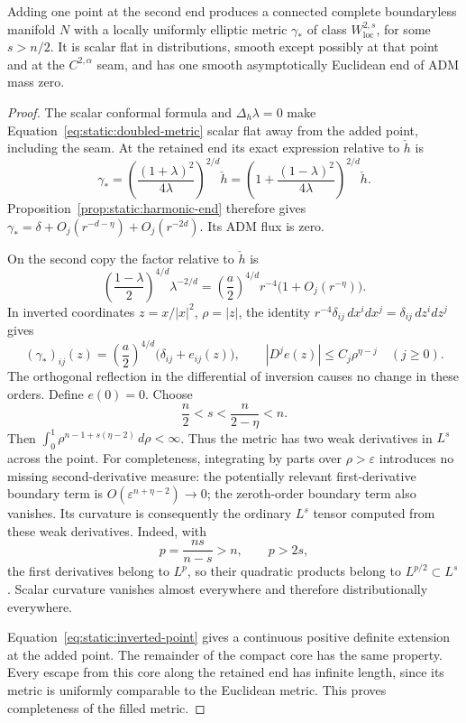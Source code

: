 \begin{lemma}
\label{lem:static:filled-double}
Adding one point at the second end produces a connected complete
boundaryless manifold $N$ with a locally uniformly elliptic metric
$\gamma_*$ of class $W^{2,s}_{\mathrm{loc}}$, for some $s>n/2$.
It is scalar flat in distributions, smooth except possibly at that
point and at the $C^{2,\alpha}$ seam, and has one smooth
asymptotically Euclidean end of ADM mass zero.
\end{lemma}

\begin{proof}
The scalar conformal formula and $\Delta_h\lambda=0$ make
Equation~\eqref{eq:static:doubled-metric} scalar flat away from the
added point, including the seam.  At the retained end its exact
expression relative to $\check h$ is
\[
 \gamma_*
 =\left(\frac{(1+\lambda)^2}{4\lambda}\right)^{2/d}\check h
 =\left(1+\frac{(1-\lambda)^2}{4\lambda}\right)^{2/d}\check h.
\]
Proposition~\ref{prop:static:harmonic-end} therefore gives
$\gamma_* =\delta+O_j(r^{-d-\eta})+O_j(r^{-2d})$.
Its ADM flux is zero.

On the second copy the factor relative to $\check h$ is
\[
 \left(\frac{1-\lambda}{2}\right)^{4/d}\lambda^{-2/d}
  =\left(\frac a2\right)^{4/d}r^{-4}
      \bigl(1+O_j(r^{-\eta})\bigr).
\]
In inverted coordinates $z=x/|x|^2$, $\rho=|z|$, the identity
$r^{-4}\delta_{ij}\,dx^i dx^j=\delta_{ij}\,dz^i dz^j$ gives
\begin{equation}
 (\gamma_*)_{ij}(z)
   =\left(\frac a2\right)^{4/d}
          \bigl(\delta_{ij}+e_{ij}(z)\bigr),
 \qquad |D^j e(z)|\le C_j\rho^{\eta-j}\quad(j\ge0).
 \label{eq:static:inverted-point}
\end{equation}
The orthogonal reflection in the differential of inversion causes
no change in these orders.  Define $e(0)=0$.  Choose
\begin{equation}
 \frac n2<s<\frac{n}{2-\eta}<n.
 \label{eq:static:point-exponents}
\end{equation}
Then $\int_0^1\rho^{n-1+s(\eta-2)}\,d\rho<\infty$.
Thus the metric has two weak derivatives in $L^s$ across the point.
For completeness, integrating by parts over $\rho>\varepsilon$
introduces no missing second-derivative measure: the potentially
relevant first-derivative boundary term is
$O(\varepsilon^{n+\eta-2})\to0$; the zeroth-order boundary term also
vanishes.  Its curvature is consequently the ordinary $L^s$ tensor
computed from these weak derivatives.  Indeed, with
\[
 p=\frac{ns}{n-s}>n,\qquad p>2s,
\]
the first derivatives belong to $L^p$, so their quadratic products
belong to $L^{p/2}\subset L^s$.  Scalar curvature vanishes almost
everywhere and therefore distributionally everywhere.

Equation~\eqref{eq:static:inverted-point} gives a continuous positive
definite extension at the added point.  The remainder of the compact
core has the same property.  Every escape from this core along the
retained end has infinite length, since its metric is uniformly
comparable to the Euclidean metric.  This proves completeness of the
filled metric.
\end{proof}

